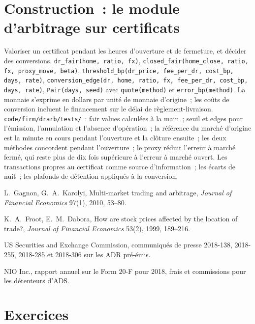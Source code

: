 \section{Construction~: le module d'arbitrage sur certificats}\label{bld:hf:depositary-receipts-and-dual-listings:drarb}

\begin{build}
 Valoriser un certificat pendant les heures d'ouverture et de fermeture, et décider des conversions.
 \texttt{dr\_fair(home, ratio, fx)}, \texttt{closed\_fair(home\_close, ratio, fx, proxy\_move, beta)},
\texttt{threshold\_bp(dr\_price, fee\_per\_dr, cost\_bp, days, rate)},
\texttt{conversion\_edge(dr, home, ratio, fx, fee\_per\_dr, cost\_bp, days, rate)}, \texttt{Pair(days, seed)} avec \texttt{quote(method)} et \texttt{error\_bp(method)}.
 La monnaie s'exprime en dollars par unité de monnaie d'origine~; les coûts de conversion incluent le financement sur le délai de règlement-livraison.
 \texttt{code/firm/drarb/tests/}~: fair values calculées à la main~; seuil et edges pour l'émission, l'annulation et l'absence d'opération~; la référence du
marché d'origine est la minute en cours pendant l'ouverture et la clôture ensuite~; les deux méthodes concordent pendant l'ouverture~; le proxy réduit l'erreur à marché fermé, qui
reste plus de dix fois supérieure à l'erreur à marché ouvert.
 Les transactions propres au certificat comme source d'information~; les écarts de nuit~; les plafonds de détention appliqués à la conversion.
\end{build}

\begin{omsources}
\item L.~Gagnon, G.~A.~Karolyi, Multi-market trading and arbitrage, \emph{Journal of Financial Economics} 97(1), 2010, 53--80.
\item K.~A.~Froot, E.~M.~Dabora, How are stock prices affected by the location of trade?, \emph{Journal of Financial Economics} 53(2), 1999,
189--216.
\item US Securities and Exchange Commission, communiqués de presse 2018-138, 2018-255, 2018-285 et 2018-306 sur les ADR pré-émis.
\item NIO Inc., rapport annuel sur le Form 20-F pour 2018, frais et commissions pour les détenteurs d'ADS.
\end{omsources}

\section{Exercices}

